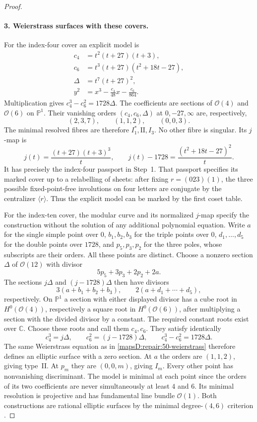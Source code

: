 \begin{proof}
\paragraph{3. Weierstrass surfaces with these covers.}
For the index-four cover an explicit model is
\begin{equation}\label{mapsD:repair:50-weierstrass}
\begin{split}
 c_4&=t^2(t+27)(t+3),\\
 c_6&=t^3(t+27)(t^2+18t-27),\\
 \Delta&=t^7(t+27)^2,\\
 y^2&=x^3-\frac{c_4}{48}x-\frac{c_6}{864}.
\end{split}
\end{equation}
Multiplication gives $c_4^3-c_6^2=1728\Delta$.  The coefficients
are sections of $\mathcal O(4)$ and $\mathcal O(6)$ on
$\mathbb P^1$.  Their vanishing orders $(c_4,c_6,\Delta)$ at
$0,-27,\infty$ are, respectively,
\[
 (2,3,7),\qquad(1,1,2),\qquad(0,0,3).
\]
The minimal resolved fibres are therefore $I_1^*,\mathrm{II},I_3$.
No other fibre is singular.  Its $j$-map is
\[
 j(t)=\frac{(t+27)(t+3)^3}{t},\qquad
 j(t)-1728=\frac{(t^2+18t-27)^2}{t}.
\]
It has precisely the index-four passport in Step~1.  That passport
specifies its marked cover up to a relabelling of sheets: after
fixing $r=(023)(1)$, the three possible fixed-point-free involutions
on four letters are conjugate by the centralizer $\langle r\rangle$.
Thus the explicit model can be marked by the first coset table.

For the index-ten cover, the modular curve and its normalized
$j$-map specify the construction without the solution of any
additional polynomial equation.  Write $a$ for the single simple
point over $0$, $b_1,b_2,b_3$ for the triple points over $0$,
$d_1,\ldots,d_5$ for the double points over $1728$, and
$p_5,p_3,p_2$ for the three poles, whose subscripts are their orders.
All these points are distinct.  Choose a nonzero section
$\Delta$ of $\mathcal O(12)$ with divisor
\[
 5p_5+3p_3+2p_2+2a.
\]
The sections $j\Delta$ and $(j-1728)\Delta$ then have divisors
\[
 3(a+b_1+b_2+b_3),\qquad
 2(a+d_1+\cdots+d_5),
\]
respectively.  On $\mathbb P^1$ a section with either displayed
divisor has a cube root in $H^0(\mathcal O(4))$, respectively a
square root in $H^0(\mathcal O(6))$, after multiplying a section
with the divided divisor by a constant.  The required constant
roots exist over $\mathbb C$.  Choose these roots and call them
$c_4,c_6$.  They satisfy identically
\[
 c_4^3=j\Delta,\qquad c_6^2=(j-1728)\Delta,
 \qquad c_4^3-c_6^2=1728\Delta.
\]
The same Weierstrass equation as in
\eqref{mapsD:repair:50-weierstrass} therefore defines an elliptic
surface with a zero section.  At $a$ the orders are $(1,1,2)$,
giving type~II.  At $p_m$ they are $(0,0,m)$, giving $I_m$.
Every other point has nonvanishing discriminant.  The model is
minimal at each point since the orders of its two coefficients
are never simultaneously at least $4$ and $6$.  Its minimal
resolution is projective and has fundamental line bundle
$\mathcal O(1)$.  Both constructions are rational elliptic
surfaces by the minimal degree-$(4,6)$ criterion
\cite[\S8.2--8.4, pp.~38--39]{manSS10}.


\end{proof}
